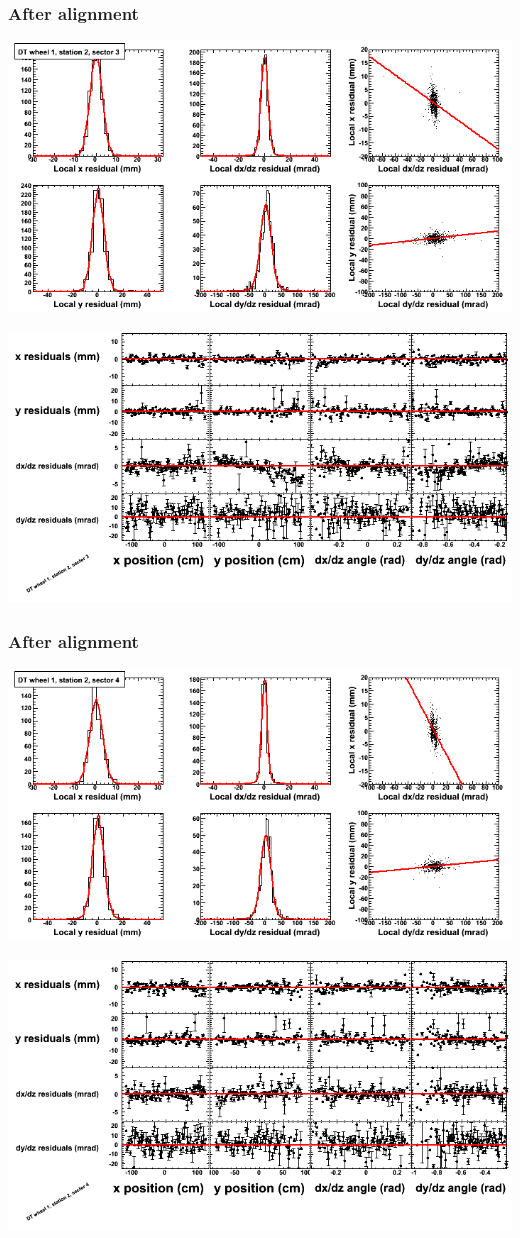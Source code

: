 \documentclass[compress]{beamer}
\begin{document}
\begin{frame}
\frametitle{After alignment}
\includegraphics[width=0.7\linewidth]{NOV4_fitfunctions/MBwhDst2sec03_bellcurves.png}

\includegraphics[width=0.7\linewidth]{NOV4_fitfunctions/MBwhDst2sec03_polynomials.png}
\end{frame}

\begin{frame}
\frametitle{After alignment}
\includegraphics[width=0.7\linewidth]{NOV4_fitfunctions/MBwhDst2sec04_bellcurves.png}

\includegraphics[width=0.7\linewidth]{NOV4_fitfunctions/MBwhDst2sec04_polynomials.png}
\end{frame}
\end{document}
